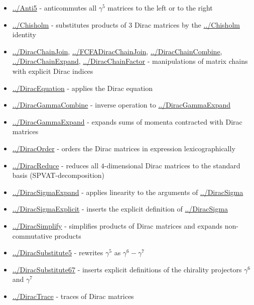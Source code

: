 \documentclass[../FeynCalcManual.tex]{subfiles}
\begin{document}
\begin{itemize}
\tightlist
\item
  \hyperlink{../anti5}{../Anti5} - anticommutes all \(\gamma^5\)
  matrices to the left or to the right
\item
  \hyperlink{../chisholm}{../Chisholm} - substitutes products of \(3\)
  Dirac matrices by the \hyperlink{../chisholm}{../Chisholm} identity
\item
  \hyperlink{../diracchainjoin}{../DiracChainJoin},
  \hyperlink{../fcfadiracchainjoin}{../FCFADiracChainJoin},
  \hyperlink{../diracchaincombine}{../DiracChainCombine},
  \hyperlink{../diracchainexpand}{../DiracChainExpand},
  \hyperlink{../diracchainfactor}{../DiracChainFactor} - manipulations
  of matrix chains with explicit Dirac indices
\item
  \hyperlink{../diracequation}{../DiracEquation} - applies the Dirac
  equation
\item
  \hyperlink{../diracgammacombine}{../DiracGammaCombine} - inverse
  operation to \hyperlink{../diracgammaexpand}{../DiracGammaExpand}
\item
  \hyperlink{../diracgammaexpand}{../DiracGammaExpand} - expands sums of
  momenta contracted with Dirac matrices
\item
  \hyperlink{../diracorder}{../DiracOrder} - orders the Dirac matrices
  in expression lexicographically
\item
  \hyperlink{../diracreduce}{../DiracReduce} - reduces all
  \(4\)-dimensional Dirac matrices to the standard basis
  (SPVAT-decomposition)
\item
  \hyperlink{../diracsigmaexpand}{../DiracSigmaExpand} - applies
  linearity to the arguments of \hyperlink{../diracsigma}{../DiracSigma}
\item
  \hyperlink{../diracsigmaexplicit}{../DiracSigmaExplicit} - inserts the
  explicit definition of \hyperlink{../diracsigma}{../DiracSigma}
\item
  \hyperlink{../diracsimplify}{../DiracSimplify} - simplifies products
  of Dirac matrices and expands non-commutative products
\item
  \hyperlink{../diracsubstitute5}{../DiracSubstitute5} - rewrites
  \(\gamma^5\) as \(\gamma^6-\gamma^7\)
\item
  \hyperlink{../diracsubstitute67}{../DiracSubstitute67} - inserts
  explicit definitions of the chirality projectors \(\gamma^6\) and
  \(\gamma^7\)
\item
  \hyperlink{../diractrace}{../DiracTrace} - traces of Dirac matrices

\end{itemize}
\end{document}
